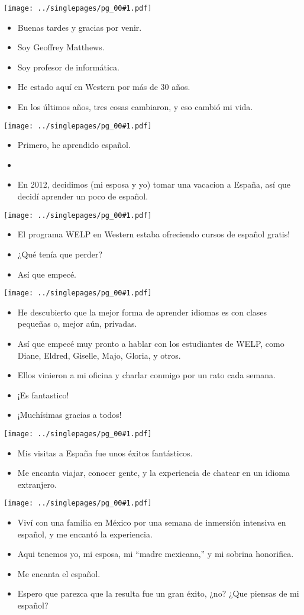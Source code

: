 \documentclass[12pt]{article}
\newcommand{\bi}{\begin{itemize}}
\newcommand{\ei}{\end{itemize}}
\newcommand{\cue}{\mbox{}
  \fbox{\sf Next slide}
}
\newcommand{\fig}[1]{
  \newpage  
  \begin{center}
    \texttt{[image: ../singlepages/pg\_00\#1.pdf]}
  \end{center}
  
}
\begin{document}
\Large


\fig{01}
\bi
\item Buenas tardes y gracias por venir.
\item Soy Geoffrey Matthews.
\item Soy  profesor de informática.
\item He estado aquí en Western por más de 30 años.
\item En los últimos años, tres cosas cambiaron, y eso cambió mi vida.
  \ei
  
\fig{03}

\bi
\item Primero, he aprendido español.
\item \cue
\item En 2012, decidimos (mi esposa y
yo) tomar una vacacion a España, así que decidí aprender un poco de
español.
\ei

\fig{04}

\bi
\item El programa WELP en Western estaba ofreciendo cursos de
  español gratis!
\item ¿Qué tenía que perder?
\item  Así que empecé.
\ei

\fig{05}

\bi
\item He descubierto que la mejor forma de aprender idiomas es con clases
  pequeñas o, mejor aún, privadas.
\item Así que empecé muy pronto a hablar
con los estudiantes de WELP, como Diane, Eldred, Giselle, Majo,
Gloria, y otros.
\item Ellos vinieron a mi oficina y charlar conmigo por un
  rato cada semana.
\item ¡Es fantastico!
\item ¡Muchísimas gracias a todos!
\ei

\fig{06}
\bi
\item Mis visitas a España fue unos éxitos fantásticos.
\item  Me encanta viajar,
conocer gente, y la experiencia de chatear en un idioma extranjero.
\ei

\fig{07}

\bi
\item Viví con una familia en México por una semana de inmersión intensiva
en español, y me encantó la experiencia.
\item
Aqui tenemos yo, mi esposa, mi ``madre mexicana,'' y mi sobrina
honorifica.  
\item
  Me encanta el español.
\item Espero que parezca que la resulta fue un gran
éxito, ¿no?  ¿Que piensas de mi español?
\ei
\end{document}
